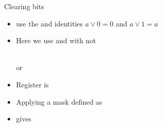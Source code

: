 \documentclass[svgnames,x11names]{beamer}
\begin{document}
\begin{frame}[fragile]{Clearing bits}
  \begin{itemize}
  \item use the \alert{and} identities $ a \vee 0 = 0$ and $a \vee 1 = a$
  \item Here we use \alert{and} with \alert{not}
    \begin{minipage}{0.8\linewidth}
      \begin{block}{}
      \end{block}
    \end{minipage}\\
 or\\
 \begin{minipage}{0.8\linewidth}
   \begin{block}{}
   \end{block}
 \end{minipage}
  \end{itemize}

  \begin{example}
    \begin{itemize}
    \item 
    Register is
    \item Applying a mask defined as
      \begin{minipage}{0.8\linewidth}
        \begin{block}{}
        \end{block}
      \end{minipage}
    \item gives 
    \end{itemize}
  \end{example}
\end{frame}
\end{document}
